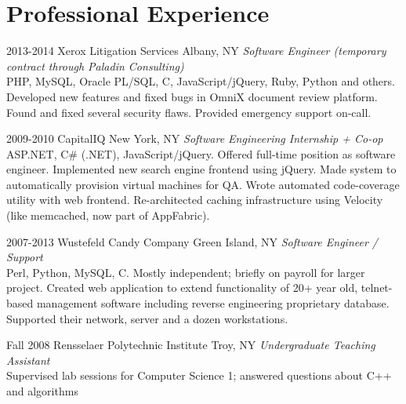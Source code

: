 \documentclass[]{friggeri-cv} %
\begin{document}

\section{Professional Experience}

\begin{entrylist}


\entry
{2013-2014}
{Xerox Litigation Services}
{Albany, NY}
{\emph{Software Engineer (temporary contract through Paladin Consulting)} \\
PHP, MySQL, Oracle PL/SQL, C, JavaScript/jQuery, Ruby, Python and others. Developed new features and fixed bugs in OmniX document review platform. Found and fixed several security flaws. Provided emergency support on-call.
}

\entry
{2009-2010}
{CapitalIQ}
{New York, NY}
{
\emph{Software Engineering Internship + Co-op} \\
ASP.NET, C\# (.NET), JavaScript/jQuery. Offered full-time position as software engineer. Implemented new search engine frontend using jQuery. Made system to automatically provision virtual machines for QA. Wrote automated code-coverage utility with web frontend. Re-architected caching infrastructure using Velocity (like memcached, now part of AppFabric).
}

\entry
{2007-2013}
{Wustefeld Candy Company}
{Green Island, NY}
{
\emph{Software Engineer / Support} \\
Perl, Python, MySQL, C. Mostly independent; briefly on payroll for larger project. Created web application to extend functionality of 20+ year old, telnet-based management software including reverse engineering proprietary database. Supported their network, server and a dozen workstations.
}


\entry
{Fall 2008}
{Rensselaer Polytechnic Institute}
{Troy, NY}
{
\emph{Undergraduate Teaching Assistant} \\
Supervised lab sessions for Computer Science 1; answered questions about C++ and algorithms
}

\end{entrylist}


\end{document}
